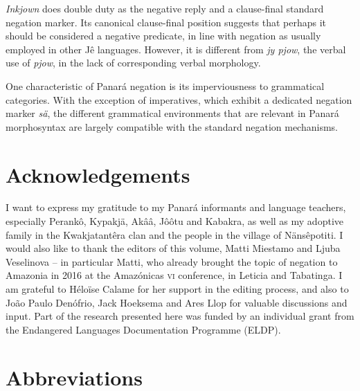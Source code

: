 \documentclass[output=paper,colorlinks,citecolor=brown,draft]{langscibook}
\begin{document}
\hspace*{-3pt}\textit{Inkjown} does double duty as the negative reply and a clause-final standard negation marker. Its canonical clause-final position suggests that perhaps it should be considered a negative predicate, in line with negation as usually employed in other Jê languages. However, it is different from \textit{jy pjow}, the verbal use of \textit{pjow}, in the lack of corresponding verbal morphology.

One characteristic of Panará negation is its imperviousness to grammatical categories. With the exception of imperatives, which exhibit a dedicated negation marker \textit{sä}, the different grammatical environments that are relevant in Panará morphosyntax are largely compatible with the standard negation mechanisms.



\section*{Acknowledgements}

I want to express my gratitude to my Panará informants and language teachers, especially Perankô, Kypakjä, Akââ, Jôôtu and Kabakra, as well as my adoptive family in the Kwakjatantêra clan and the people in the village of Nänsêpotiti. I would also like to thank the editors of this volume, Matti Miestamo and Ljuba Veselinova -- in particular Matti, who already brought the topic of negation to Amazonia in 2016 at the Amazónicas \textsc{vi} conference, in Leticia and Tabatinga. I am grateful to Héloïse Calame for her support in the editing process, and also to João Paulo Denófrio, Jack Hoeksema and Ares Llop for valuable discussions and input. Part of the research presented here was funded by an individual grant from the Endangered Languages Documentation Programme (ELDP).


\section*{Abbreviations}
\end{document}
